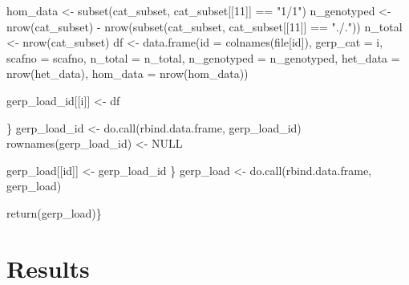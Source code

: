 \documentclass[
  letterpaper,
  DIV=11,
  numbers=noendperiod]{scrreprt}
\newenvironment{Shaded}{}{}
\newcommand{\AttributeTok}[1]{\textcolor[rgb]{0.84,0.23,0.29}{#1}}
\newcommand{\ConstantTok}[1]{\textcolor[rgb]{0.00,0.36,0.77}{#1}}
\newcommand{\DecValTok}[1]{\textcolor[rgb]{0.00,0.36,0.77}{#1}}
\newcommand{\FunctionTok}[1]{\textcolor[rgb]{0.44,0.26,0.76}{#1}}
\newcommand{\NormalTok}[1]{\textcolor[rgb]{0.14,0.16,0.18}{#1}}
\newcommand{\OtherTok}[1]{\textcolor[rgb]{0.44,0.26,0.76}{#1}}
\newcommand{\SpecialCharTok}[1]{\textcolor[rgb]{0.00,0.36,0.77}{#1}}
\newcommand{\StringTok}[1]{\textcolor[rgb]{0.01,0.18,0.38}{#1}}
\begin{document}
\begin{Shaded}
\begin{Highlighting}[]
\NormalTok{        hom\_data }\OtherTok{\textless{}{-}} \FunctionTok{subset}\NormalTok{(cat\_subset, cat\_subset[[}\DecValTok{11}\NormalTok{]] }\SpecialCharTok{==} \StringTok{"1/1"}\NormalTok{)}
\NormalTok{        n\_genotyped }\OtherTok{\textless{}{-}} \FunctionTok{nrow}\NormalTok{(cat\_subset) }\SpecialCharTok{{-}} \FunctionTok{nrow}\NormalTok{(}\FunctionTok{subset}\NormalTok{(cat\_subset, cat\_subset[[}\DecValTok{11}\NormalTok{]] }\SpecialCharTok{==} \StringTok{"./."}\NormalTok{))}
\NormalTok{        n\_total }\OtherTok{\textless{}{-}} \FunctionTok{nrow}\NormalTok{(cat\_subset)}
\NormalTok{        df }\OtherTok{\textless{}{-}} \FunctionTok{data.frame}\NormalTok{(}\AttributeTok{id =} \FunctionTok{colnames}\NormalTok{(file[id]),}
                         \AttributeTok{gerp\_cat =}\NormalTok{ i,}
                         \AttributeTok{scafno =}\NormalTok{ scafno,}
                         \AttributeTok{n\_total =}\NormalTok{ n\_total,}
                         \AttributeTok{n\_genotyped =}\NormalTok{ n\_genotyped,}
                         \AttributeTok{het\_data =} \FunctionTok{nrow}\NormalTok{(het\_data),}
                         \AttributeTok{hom\_data =} \FunctionTok{nrow}\NormalTok{(hom\_data))}
        
\NormalTok{        gerp\_load\_id[[i]] }\OtherTok{\textless{}{-}}\NormalTok{ df}
        
\NormalTok{        \}}
\NormalTok{        gerp\_load\_id }\OtherTok{\textless{}{-}} \FunctionTok{do.call}\NormalTok{(rbind.data.frame, gerp\_load\_id)}
        \FunctionTok{rownames}\NormalTok{(gerp\_load\_id) }\OtherTok{\textless{}{-}} \ConstantTok{NULL}
    
\NormalTok{    gerp\_load[[id]] }\OtherTok{\textless{}{-}}\NormalTok{ gerp\_load\_id}
\NormalTok{    \}}
\NormalTok{  gerp\_load }\OtherTok{\textless{}{-}} \FunctionTok{do.call}\NormalTok{(rbind.data.frame, gerp\_load)}

    \FunctionTok{return}\NormalTok{(gerp\_load)\}}
\end{Highlighting}
\end{Shaded}

\hypertarget{results-1}{%
\section{Results}\label{results-1}}
\end{document}
